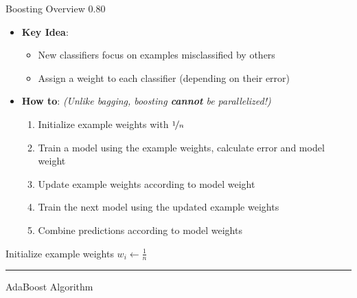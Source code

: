 \begin{frame}{Boosting Overview}{}
{	}{0.80}{
		\vspace*{-6mm}
		\begin{itemize}
			\item \textbf{Key Idea}:
			\begin{itemize}
				\item New classifiers focus on examples misclassified by others
				\item Assign a weight to each classifier (depending on their error)
			\end{itemize}
			\item \textbf{How to}:
				\footnotesize \textit{(Unlike bagging, boosting \textbf{cannot} be parallelized!)} \normalsize
			\begin{enumerate}
				\item Initialize example weights with $\nicefrac{1}{n}$
				\item Train a model using the example weights, calculate error and model weight
				\item Update example weights according to model weight
				\item Train the next model using the updated example weights
				\item Combine predictions according to model weights
			\end{enumerate}
		\end{itemize}
	}
\end{frame}


\begin{frame}[plain]{}{}
	\begin{algorithm}[H]
		\DontPrintSemicolon
		\scriptsize
		\;
		Initialize example weights $w_i \longleftarrow \frac{1}{n}$\;
		\hrule
		\;
 		\caption{AdaBoost Algorithm}
	\end{algorithm}
\end{frame}


